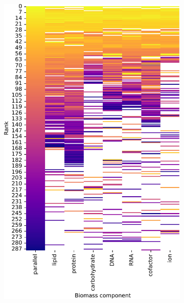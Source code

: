 \begin{figure}
  \centering
  \begin{subfigure}[t]{0.45\textwidth}
  \centering
    \includegraphics[width=\linewidth]{CompareEnzUse_glc00p00_pyr03p73_amm00p90_1.pdf}
    \caption{
    }
    \label{fig:model-rank-pyr-highratio-rank}
  \end{subfigure}%
  \begin{subfigure}[t]{0.45\textwidth}
  \centering

\end{subfigure}
\end{figure}
